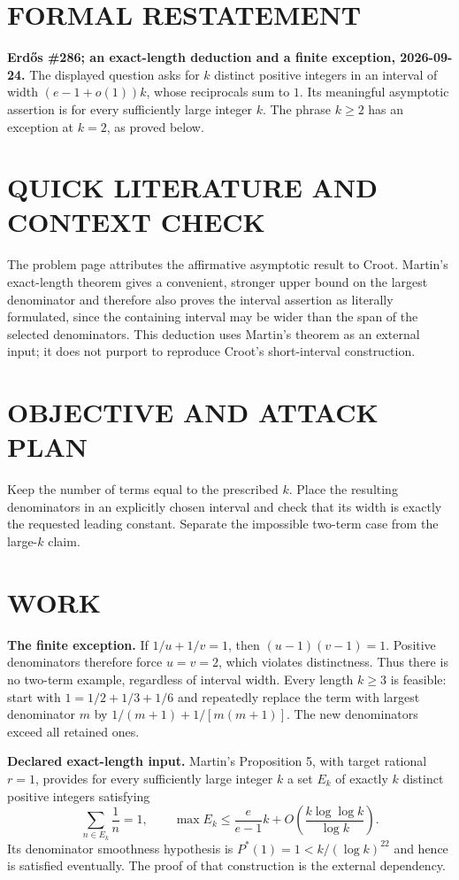 \section{FORMAL RESTATEMENT}
\textbf{Erd\H{o}s \#286; an exact-length deduction and a finite exception, 2026-09-24.}
The displayed question asks for $k$ distinct positive integers in an interval of width $(e-1+o(1))k$, whose reciprocals sum to $1$. Its meaningful asymptotic assertion is for every sufficiently large integer $k$. The phrase $k\geq2$ has an exception at $k=2$, as proved below.

\section{QUICK LITERATURE AND CONTEXT CHECK}
The problem page attributes the affirmative asymptotic result to Croot. Martin's exact-length theorem gives a convenient, stronger upper bound on the largest denominator and therefore also proves the interval assertion as literally formulated, since the containing interval may be wider than the span of the selected denominators. This deduction uses Martin's theorem as an external input; it does not purport to reproduce Croot's short-interval construction.

\section{OBJECTIVE AND ATTACK PLAN}
Keep the number of terms equal to the prescribed $k$. Place the resulting denominators in an explicitly chosen interval and check that its width is exactly the requested leading constant. Separate the impossible two-term case from the large-$k$ claim.

\section{WORK}
\textbf{The finite exception.} If $1/u+1/v=1$, then $(u-1)(v-1)=1$. Positive denominators therefore force $u=v=2$, which violates distinctness. Thus there is no two-term example, regardless of interval width. Every length $k\geq3$ is feasible: start with $1=1/2+1/3+1/6$ and repeatedly replace the term with largest denominator $m$ by $1/(m+1)+1/[m(m+1)]$. The new denominators exceed all retained ones.

\textbf{Declared exact-length input.} Martin's Proposition 5, with target rational $r=1$, provides for every sufficiently large integer $k$ a set $E_k$ of exactly $k$ distinct positive integers satisfying
\[
\sum_{n\in E_k}\frac1n=1,\qquad
\max E_k\leq\frac e{e-1}k
+O\!\left(\frac{k\log\log k}{\log k}\right).
\tag{1}
\]
Its denominator smoothness hypothesis is $P^*(1)=1<k/(\log k)^{22}$ and hence is satisfied eventually. The proof of that construction is the external dependency.

